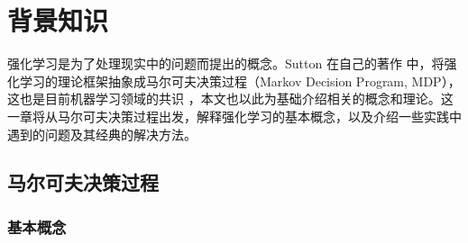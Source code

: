 
\chapter{背景知识}
\label{cha:background-knowledge}


强化学习是为了处理现实中的问题而提出的概念。Sutton 在自己的著作 \cite{suttonReinforcementLearningIntroduction2018}中，将强化学习的理论框架抽象成马尔可夫决策过程（Markov Decision Program, MDP），这也是目前机器学习领域的共识 \cite{mnihHumanlevelControlDeep2015} \cite{mnihAsynchronousMethodsDeep2016} \cite{hesselRainbowCombiningImprovements2018}  ，本文也以此为基础介绍相关的概念和理论。这一章将从马尔可夫决策过程出发，解释强化学习的基本概念，以及介绍一些实践中遇到的问题及其经典的解决方法。

\section{马尔可夫决策过程}
\subsection{基本概念}




